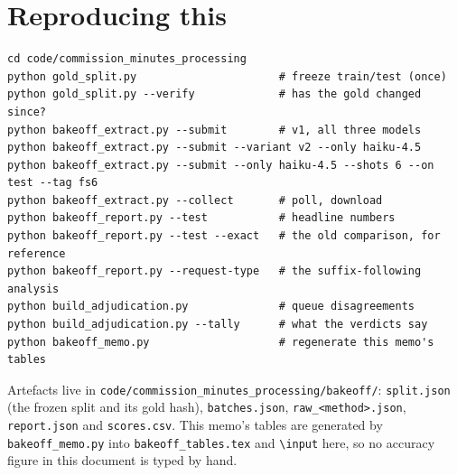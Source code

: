 \documentclass[11pt]{article}
\begin{document}
\section{Reproducing this}
\label{sec:reproduce}

\begin{verbatim}
cd code/commission_minutes_processing
python gold_split.py                      # freeze train/test (once)
python gold_split.py --verify             # has the gold changed since?
python bakeoff_extract.py --submit        # v1, all three models
python bakeoff_extract.py --submit --variant v2 --only haiku-4.5
python bakeoff_extract.py --submit --only haiku-4.5 --shots 6 --on test --tag fs6
python bakeoff_extract.py --collect       # poll, download
python bakeoff_report.py --test           # headline numbers
python bakeoff_report.py --test --exact   # the old comparison, for reference
python bakeoff_report.py --request-type   # the suffix-following analysis
python build_adjudication.py              # queue disagreements
python build_adjudication.py --tally      # what the verdicts say
python bakeoff_memo.py                    # regenerate this memo's tables
\end{verbatim}

\begin{sloppypar}
\noindent
Artefacts live in \texttt{code/commission\_minutes\_processing/bakeoff/}:
\texttt{split.json} (the frozen split and its gold hash), \texttt{batches.json},
\texttt{raw\_<method>.json}, \texttt{report.json} and \texttt{scores.csv}. This memo's tables
are generated by \texttt{bakeoff\_memo.py} into \texttt{bakeoff\_tables.tex} and
\texttt{\textbackslash input} here, so no accuracy figure in this document is typed by hand.
\end{sloppypar}
\end{document}
